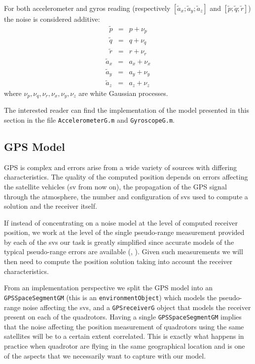 \documentclass[a4paper,11pt]{report}
\begin{document}
For both accelerometer and gyros reading (respectively $[\tilde{a}_x;\tilde{a}_y;\tilde{a}_z]$ and $[\tilde{p};\tilde{q};\tilde{r}]$) the noise is considered additive:
\begin{eqnarray}
  \tilde{p} &=& p + \nu_p\\
  \tilde{q} &=& q + \nu_q\\
  \tilde{r} &=& r + \nu_r
\end{eqnarray}
\begin{eqnarray}
  \tilde{a}_x &=& a_x + \nu_x\\
  \tilde{a}_y &=& a_y + \nu_y\\
  \tilde{a}_z &=& a_z + \nu_z
\end{eqnarray}
where  $\nu_p,\nu_q,\nu_r,\nu_x,\nu_y,\nu_z$ are white Gaussian processes.

The interested reader can find the implementation of the model presented in this section in the file \texttt{AccelerometerG.m} and \texttt{GyroscopeG.m}.  

\subsection{GPS Model}

GPS is complex and errors arise from a wide variety of sources with differing characteristics. The quality of the computed position depends on errors affecting the satellite vehicles (sv from now on), the propagation of the GPS signal through the atmosphere, the number and configuration of svs used to compute a solution and the receiver itself.

If instead of concentrating on a noise model at the level of computed receiver position, we work at the level of the single pseudo-range measurement provided by each of the svs our task is greatly simplified since accurate models of the typical pseudo-range errors are available (\cite{rankin1994anerror}, \cite{carlson2010mapping}). Given such measurements we will then need to compute the position solution taking into account the receiver characteristics.

From an implementation perspective we split the GPS model into an \texttt{GPSSpaceSegmentGM} (this is an \texttt{environmentObject}) which models the pseudo-range noise affecting the svs, and a \texttt{GPSreceiverG} object that models the receiver present on each of the quadrotors. Having a single \texttt{GPSSpaceSegmentGM}
implies that the noise affecting the position measurement of quadrotors using the same satellites will be to a certain extent correlated. This is exactly what happens in practice when quadrotor are flying in the same geographical location and is one of the aspects that we necessarily want to capture with our model.
  
\end{document}
